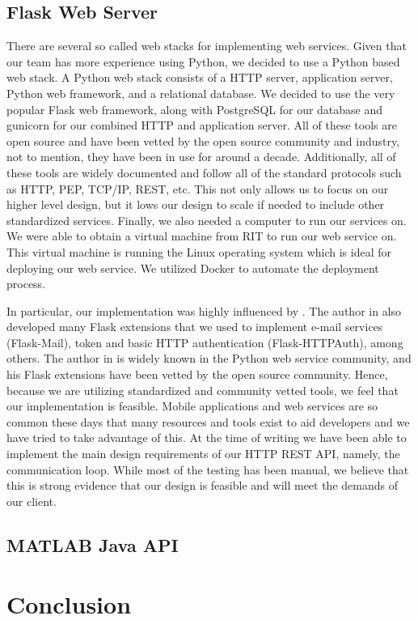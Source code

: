 \documentclass[conference]{IEEEtran}
\begin{document}
\subsection{Flask Web Server}

There are several so called web stacks for implementing web services. Given that our team has more experience using Python, we decided to use a Python based web stack. A Python web stack consists of a HTTP server, application server, Python web framework, and a relational database. We decided to use the very popular Flask web framework, along with PostgreSQL for our database and gunicorn for our combined HTTP and application server. All of these tools are open source and have been vetted by the open source community and industry, not to mention, they have been in use for around a decade. Additionally, all of these tools are widely documented and follow all of the standard protocols such as HTTP, PEP, TCP/IP, REST, etc. This not only allows us to focus on our higher level design, but it 
lows our design to scale if needed to include other standardized services. Finally, we also needed a computer to run our services on. We were able to obtain a virtual machine from RIT to run our web service on. This virtual machine is running the Linux operating system which is ideal for deploying our web service. We utilized Docker to automate the deployment process.

In particular, our implementation was highly influenced by \cite{grinberg2018new}. The author in \cite{grinberg2018new} also developed many Flask extensions that we used to implement e-mail services (Flask-Mail), token and basic HTTP authentication (Flask-HTTPAuth), among others. The author in \cite{grinberg2018new} is widely known in the Python web service community, and his Flask extensions have been vetted by the open source community. Hence, because we are utilizing standardized and community vetted tools, we feel that our implementation is feasible. Mobile applications and web services are so common these days that many resources and tools exist to aid developers and we have tried to take advantage of this. At the time of writing we have been able to implement the main design requirements of our HTTP REST API, namely, the communication loop. While most of the testing has been manual, we believe that this is strong evidence that our design is feasible and will meet the demands of our client.

\subsection{MATLAB Java API}

\section{Conclusion}



\end{document}
